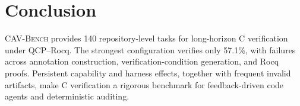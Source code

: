 \section{Conclusion}

\textsc{CAV-Bench} provides 140 repository-level tasks for long-horizon C verification under QCP--Rocq. The strongest configuration verifies only 57.1\%, with failures across annotation construction, verification-condition generation, and Rocq proofs. Persistent capability and harness effects, together with frequent invalid artifacts, make C verification a rigorous benchmark for feedback-driven code agents and deterministic auditing.

